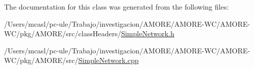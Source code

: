 The documentation for this class was generated from the following files:\begin{DoxyCompactItemize}
\item 
/Users/mcasl/pc-\/ule/Trabajo/investigacion/AMORE/AMORE-\/WC/AMORE-\/WC/pkg/AMORE/src/classHeaders/\hyperlink{_simple_network_8h}{SimpleNetwork.h}\item 
/Users/mcasl/pc-\/ule/Trabajo/investigacion/AMORE/AMORE-\/WC/AMORE-\/WC/pkg/AMORE/src/\hyperlink{_simple_network_8cpp}{SimpleNetwork.cpp}\end{DoxyCompactItemize}
